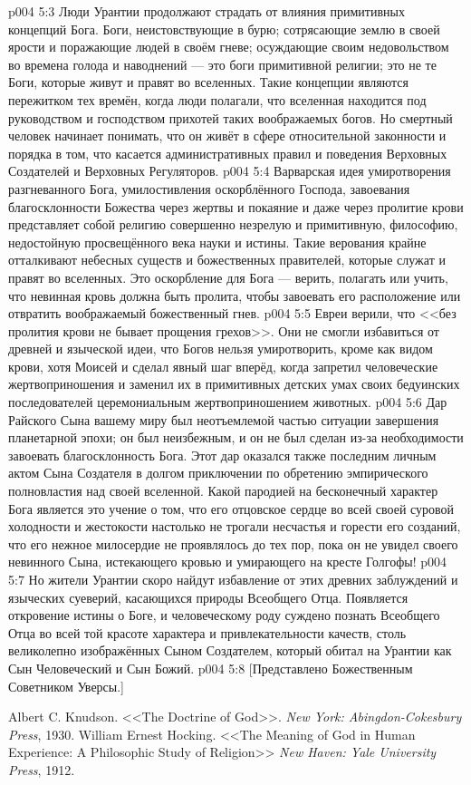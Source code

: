 \vs p004 5:3 \pc Люди Урантии продолжают страдать от влияния примитивных концепций Бога. Боги, неистовствующие в бурю; сотрясающие землю в своей ярости и поражающие людей в своём гневе; осуждающие своим недовольством во времена голода и наводнений --- это боги примитивной религии; это не те Боги, которые живут и правят во вселенных. Такие концепции являются пережитком тех времён, когда люди полагали, что вселенная находится под руководством и господством прихотей таких воображаемых богов. Но смертный человек начинает понимать, что он живёт в сфере относительной законности и порядка в том, что касается административных правил и поведения Верховных Создателей и Верховных Регуляторов.
\vs p004 5:4 \pc Варварская идея умиротворения разгневанного Бога, умилостивления оскорблённого Господа, завоевания благосклонности Божества через жертвы и покаяние и даже через пролитие крови представляет собой религию совершенно незрелую и примитивную, философию, недостойную просвещённого века науки и истины. Такие верования крайне отталкивают небесных существ и божественных правителей, которые служат и правят во вселенных. Это оскорбление для Бога --- верить, полагать или учить, что невинная кровь должна быть пролита, чтобы завоевать его расположение или отвратить воображаемый божественный гнев.
\vs p004 5:5 Евреи верили, что <<без пролития крови не бывает прощения грехов>>. Они не смогли избавиться от древней и языческой идеи, что Богов нельзя умиротворить, кроме как видом крови, хотя Моисей и сделал явный шаг вперёд, когда запретил человеческие жертвоприношения и заменил их в примитивных детских умах своих бедуинских последователей церемониальным жертвоприношением животных.
\vs p004 5:6 Дар Райского Сына вашему миру был неотъемлемой частью ситуации завершения планетарной эпохи; он был неизбежным, и он не был сделан из\hyp{}за необходимости завоевать благосклонность Бога. Этот дар оказался также последним личным актом Сына Создателя в долгом приключении по обретению эмпирического полновластия над своей вселенной. Какой пародией на бесконечный характер Бога является это учение о том, что его отцовское сердце во всей своей суровой холодности и жестокости настолько не трогали несчастья и горести его созданий, что его нежное милосердие не проявлялось до тех пор, пока он не увидел своего невинного Сына, истекающего кровью и умирающего на кресте Голгофы!
\vs p004 5:7 Но жители Урантии скоро найдут избавление от этих древних заблуждений и языческих суеверий, касающихся природы Всеобщего Отца. Появляется откровение истины о Боге, и человеческому роду суждено познать Всеобщего Отца во всей той красоте характера и привлекательности качеств, столь великолепно изображённых Сыном Создателем, который обитал на Урантии как Сын Человеческий и Сын Божий.
\vsetoff
\vs p004 5:8 [Представлено Божественным Советником Уверсы.]
\quizlink
\begin{thebibliography}{100}
Albert C. Knudson.
{<<The Doctrine of God>>.}
{\em New York: Abingdon-Cokesbury Press}, 1930.
William Ernest Hocking.
{<<The Meaning of God in Human Experience: A Philosophic Study of Religion>>}
{\em New Haven: Yale University Press}, 1912.
\end{thebibliography}
